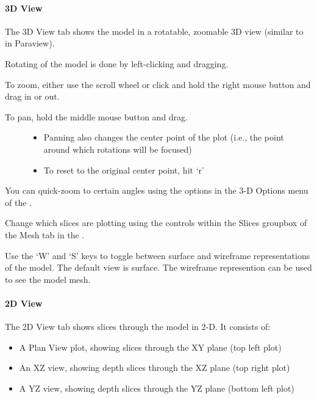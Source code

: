 \documentclass[letterpaper,10pt,english]{sphinxmanual}
\begin{document}
\paragraph{3D View}
\label{\detokenize{content/model_viewer/main_window:d-view}}
The 3D View tab shows the model in a rotatable, zoomable 3D view (similar to in Paraview).

Rotating of the model is done by left-clicking and dragging.

To zoom, either use the scroll wheel or click and hold the right mouse button and drag in or out.
\begin{description}
\item[{To pan, hold the middle mouse button and drag.}] \leavevmode\begin{itemize}
\item {} 
Panning also changes the center point of the plot (i.e., the point around which rotations will be focused)

\item {} 
To reset to the original center point, hit ‘r’

\end{itemize}

\end{description}

You can quick-zoom to certain angles using the options in the 3-D Options menu of the {\hyperref[\detokenize{content/model_viewer/main_window:menu-bar}]{}}.

Change which slices are plotting using the controls within the Slices groupbox of the Mesh tab in the {\hyperref[\detokenize{content/model_viewer/main_window:control-dock}]{}}.

Use the ‘W’ and ‘S’ keys to toggle between surface and wireframe representations of the model. The default view is surface. The wireframe represention can be used to see the model mesh.


\paragraph{2D View}
\label{\detokenize{content/model_viewer/main_window:id1}}
\begin{figure}[htbp]
\centering

\noindent{}
\end{figure}

The 2D View tab shows slices through the model in 2-D. It consists of:
\begin{itemize}
\item {} 
A Plan View plot, showing slices through the XY plane (top left plot)

\item {} 
An XZ view, showing depth slices through the XZ plane (top right plot)

\item {} 
A YZ view, showing depth slices through the YZ plane (bottom left plot)

\end{itemize}
\end{document}

